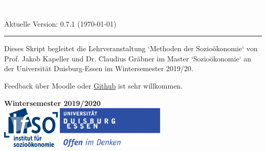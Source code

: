 \documentclass[letterpaper]{article}
\author{%
    Dr. Claudius Gr\"abner \\
    Institut f\"ur Sozio\"okonomie \\
    Universit\"at Duisburg-Essen\\
    \href{mailto:claudius.graebner@uni-due.com}{claudius.graebner@uni-due.com}\\
    \href{www.claudius-graebner.com}{https://claudius-graebner.com/}
    }
\makeatletter
\def\printauthor{%
    {\large \@author}}
\makeatother
\begin{document}
\begin{titlepage}
\BgThispage
{}
\vspace*{2cm}
\noindent
\onehalfspacing
\textcolor{white}{\bigsf R f\"ur die \mbox{sozio\"okonomische} Forschung}
\vspace*{1.2cm}\par
Aktuelle Version: 0.7.1 (\today)\\
\vspace*{2.0cm}\par
\noindent
\begin{minipage}{0.35\linewidth}
    \begin{flushright}
        \printauthor
    \end{flushright}
\end{minipage} \hspace{15pt}
%
\begin{minipage}{0.02\linewidth}
    \rule{1pt}{175pt}
\end{minipage} \hspace{-10pt}
%
\begin{minipage}{0.6\linewidth}
\vspace{5pt}
\begin{adjustwidth}{25pt}{25pt}
\raggedright
Dieses Skript begleitet die Lehrveranstaltung `Methoden der Sozio\"okonomie` von
Prof. Jakob Kapeller und Dr. Claudius Gr\"abner im Master `Sozio\"okonomie` an der
Universit\"at Duisburg-Essen im Wintersemester 2019/20.

Feedback \"uber Moodle oder
\href{https://github.com/graebnerc/RforSocioEcon}{Github} ist
sehr willkommen.
\end{adjustwidth}

\end{minipage}

\vspace{0.25cm}
\centering
\vspace{1.25cm}
\textbf{Wintersemester 2019/2020}\\
\vfill
\includegraphics[height=2cm]{ifso_logo_dt_RGB} \hspace{2cm}
\includegraphics[height=2cm]{logo_ude.pdf}
\end{titlepage}
\end{document}
